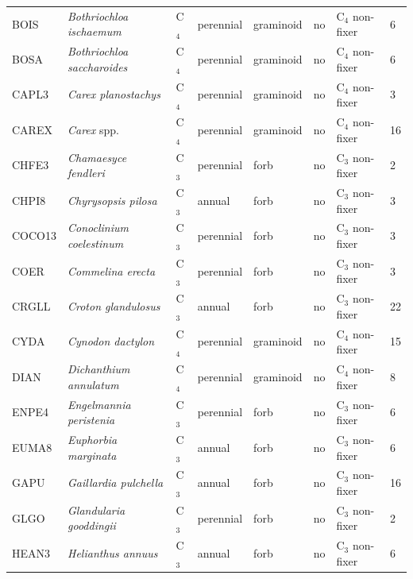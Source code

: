 \begin{landscape}
\begin{table}[]
{\begin{tabular}{p{2cm}p{5cm}p{2cm}p{2cm}p{2cm}p{2cm}p{3.5cm}p{2cm}}
            BOIS   & \textit{Bothriochloa ischaemum}    & C$_4$ & perennial & graminoid      & no  & C$_4$ non-fixer & 6  \\
            BOSA   & \textit{Bothriochloa saccharoides} & C$_4$ & perennial & graminoid      & no  & C$_4$ non-fixer & 6  \\
            CAPL3  & \textit{Carex planostachys}        & C$_4$ & perennial & graminoid      & no  & C$_4$ non-fixer & 3  \\
            CAREX  & \textit{Carex} spp.                & C$_4$ & perennial & graminoid      & no  & C$_4$ non-fixer & 16 \\
            CHFE3  & \textit{Chamaesyce fendleri}       & C$_3$ & perennial & forb           & no  & C$_3$ non-fixer & 2  \\
            CHPI8  & \textit{Chyrysopsis pilosa}        & C$_3$ & annual    & forb           & no  & C$_3$ non-fixer & 3  \\
            COCO13 & \textit{Conoclinium coelestinum}   & C$_3$ & perennial & forb           & no  & C$_3$ non-fixer & 3  \\
            COER   & \textit{Commelina erecta}          & C$_3$ & perennial & forb           & no  & C$_3$ non-fixer & 3  \\
            CRGLL  & \textit{Croton glandulosus}        & C$_3$ & annual    & forb           & no  & C$_3$ non-fixer & 22 \\
            CYDA   & \textit{Cynodon dactylon}          & C$_4$ & perennial & graminoid      & no  & C$_4$ non-fixer & 15 \\
            DIAN   & \textit{Dichanthium annulatum}     & C$_4$ & perennial & graminoid      & no  & C$_4$ non-fixer & 8  \\
            ENPE4  & \textit{Engelmannia peristenia}    & C$_3$ & perennial & forb           & no  & C$_3$ non-fixer & 6  \\
            EUMA8  & \textit{Euphorbia marginata}       & C$_3$ & annual    & forb           & no  & C$_3$ non-fixer & 6  \\
            GAPU   & \textit{Gaillardia pulchella}      & C$_3$ & annual    & forb           & no  & C$_3$ non-fixer & 16 \\
            GLGO   & \textit{Glandularia gooddingii}    & C$_3$ & perennial & forb           & no  & C$_3$ non-fixer & 2  \\
            HEAN3  & \textit{Helianthus annuus}         & C$_3$ & annual    & forb           & no  & C$_3$ non-fixer & 6  \\
            \hline
        \end{tabular}}
    \end{table}
\end{landscape}
\clearpage


